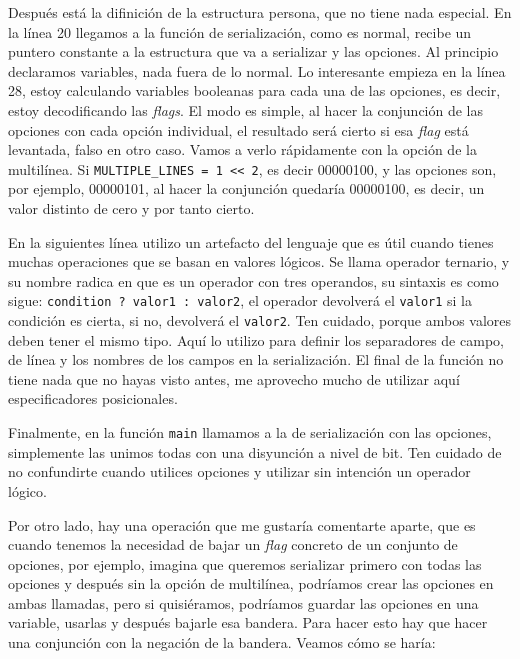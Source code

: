 \documentclass[a4paper]{article}
\begin{document}
Después está la difinición de la estructura persona, que no tiene nada
especial. En la línea 20 llegamos a la función de serialización, como es normal,
recibe un puntero constante a la estructura que va a serializar y las opciones.
Al principio declaramos variables, nada fuera de lo normal. Lo interesante
empieza en la línea 28, estoy calculando variables booleanas para cada una de
las opciones, es decir, estoy decodificando las \textit{flags}. El modo es
simple, al hacer la conjunción de las opciones con cada opción individual,
el resultado será cierto si esa \textit{flag} está levantada, falso en otro
caso. Vamos a verlo rápidamente con la opción de la multilínea. Si
\verb!MULTIPLE_LINES = 1 << 2!, es decir 00000100, y  las opciones son, por
ejemplo, 00000101, al hacer la conjunción quedaría 00000100, es decir, un valor
distinto de cero y por tanto cierto.

En la siguientes línea utilizo un artefacto del lenguaje
que es útil cuando tienes muchas operaciones que se basan en valores lógicos.
Se llama operador ternario, y su nombre radica en que es un operador con tres
operandos, su sintaxis es como sigue: \verb!condition ? valor1 : valor2!,
el operador devolverá el \verb!valor1! si la condición es cierta, si no,
devolverá el \verb!valor2!. Ten cuidado, porque ambos valores deben tener el
mismo tipo. Aquí lo utilizo para definir los separadores de campo, de línea y
los nombres de los campos en la serialización.
El final de la función no tiene nada que no hayas visto antes, me aprovecho
mucho de utilizar aquí especificadores posicionales.

Finalmente, en la función \verb!main! llamamos a la de serialización con las
opciones, simplemente las unimos todas con una disyunción a nivel de bit.
Ten cuidado de no confundirte cuando utilices opciones y utilizar sin
intención un operador lógico.

Por otro lado, hay una operación que me gustaría comentarte aparte, que es
cuando tenemos la necesidad de bajar un \textit{flag} concreto de un conjunto de
opciones, por ejemplo, imagina que queremos serializar primero con todas las
opciones y después sin la opción de multilínea, podríamos crear las opciones
en ambas llamadas, pero si quisiéramos, podríamos guardar las opciones en una
variable, usarlas y después bajarle esa bandera. Para hacer esto hay que hacer
una conjunción con la negación de la bandera. Veamos cómo se haría:
\end{document}
